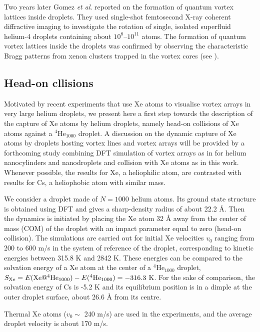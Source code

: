 		Two years later Gomez \emph{et al}. reported\citep{Gom14} on the formation of quantum vortex lattices inside droplets. They used single-shot femtosecond X-ray coherent diffractive imaging to investigate the rotation of single, isolated superfluid helium-4 droplets containing about $10^8$--$10^{11}$ atoms. The formation of quantum vortex lattices inside the droplets was confirmed by observing the characteristic Bragg patterns from xenon clusters trapped in the vortex cores (see ).
	
	\subsection*{Head-on cllisions}
		Motivated by recent experiments that use Xe atoms to visualise vortex arrays in very large helium droplets\citep{Gom14,Jon16}, we present here a first step towards the description of the capture  of Xe atoms by helium droplets, namely head-on collisions of Xe atoms against a $^4$He$_{1000}$ droplet. A discussion on the dynamic capture of Xe atoms by droplets hosting vortex lines and vortex arrays will be provided by a forthcoming study combining DFT simulation of vortex arrays as in for helium nanocylinders and nanodroplets  and collision with Xe atoms as in this work. Whenever possible, the results for Xe, a heliophilic atom,  are contrasted with results for Cs, a heliophobic atom with similar mass.
		
		We consider a droplet made of $N=1000$ helium atoms. Its ground state structure is obtained using DFT and gives a sharp-density  radius of about 22.2 \AA{}. Then the dynamics is initiated by placing the Xe atom 32 \AA{} away from the center of mass (COM) of the droplet with an impact parameter equal to zero (head-on collision). The simulations are carried out for initial Xe velocities  $v_0$ ranging from 200 to  600 m/s in the system of reference of the droplet, corresponding to kinetic energies between  315.8 K and  2842 K. These energies can be compared to the solvation energy of a Xe atom at the center of a $^4$He$_{1000}$ droplet, $S_{{\rm Xe}} = E({\rm Xe}@^4{\rm He}_{1000}) - E(^4{\rm He}_{1000}) = -316.3$ K. For the sake of comparison, the solvation energy of Cs is -5.2 K and its equilibrium position is  in a dimple at the outer droplet surface, about 26.6 \AA{} from its centre. 

		Thermal Xe atoms ($v_0 \sim$ 240 m/s) are used in the experiments\citep{Gom14,Jon16}, and the average droplet velocity is about 170 m/s\citep{Gom11}.

